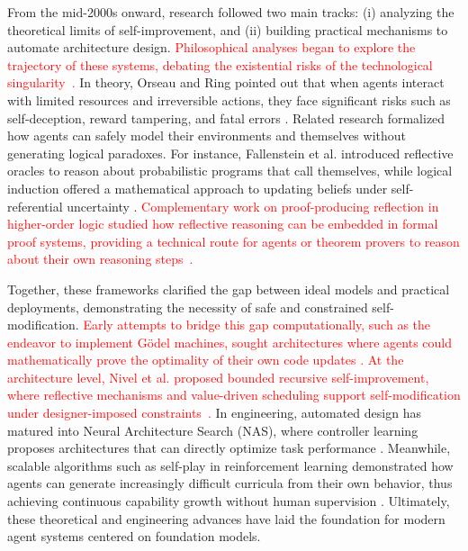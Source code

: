 From the mid-2000s onward, research followed two main tracks: (i) analyzing the theoretical limits of self-improvement, and (ii) building practical mechanisms to automate architecture design. \textcolor{red}{Philosophical analyses began to explore the trajectory of these systems, debating the existential risks of the technological singularity~\citep{subramanian2010science}.}
In theory, Orseau and Ring pointed out that when agents interact with limited resources and irreversible actions, they face significant risks such as self-deception, reward tampering, and fatal errors \citep{orseau2011self}. Related research formalized how agents can safely model their environments and themselves without generating logical paradoxes. For instance, Fallenstein et al. \citep{fallenstein2015reflectiveoraclesfoundationclassical} introduced reflective oracles to reason about probabilistic programs that call themselves,  while logical induction offered a mathematical approach to updating beliefs under self-referential uncertainty \citep{garrabrant2016logical}. \textcolor{red}{Complementary work on proof-producing reflection in higher-order logic studied how reflective reasoning can be embedded in formal proof systems, providing a technical route for agents or theorem provers to reason about their own reasoning steps~\citep{fallenstein2015proof}.} 

Together, these frameworks clarified the gap between ideal models and practical deployments, demonstrating the  necessity of safe and constrained self-modification. \textcolor{red}{Early attempts to bridge this gap computationally, such as the endeavor to implement Gödel machines, sought architectures where agents could mathematically prove the optimality of their own code updates \citep{steunebrink2012towards}. At the architecture level, Nivel et al. proposed bounded recursive self-improvement, where reflective mechanisms and value-driven scheduling support self-modification under designer-imposed constraints~\citep{nivel2013bounded}.} 
In engineering, automated design has matured into Neural Architecture Search (NAS), where controller learning proposes architectures that can directly optimize task performance \citep{zoph2017neural}. Meanwhile, scalable algorithms such as self-play in reinforcement learning demonstrated how agents can generate increasingly difficult curricula from their own behavior, thus achieving continuous capability growth without human supervision \citep{silver2017mastering}. Ultimately, these theoretical and engineering advances have laid the foundation for modern agent systems centered on foundation models.


